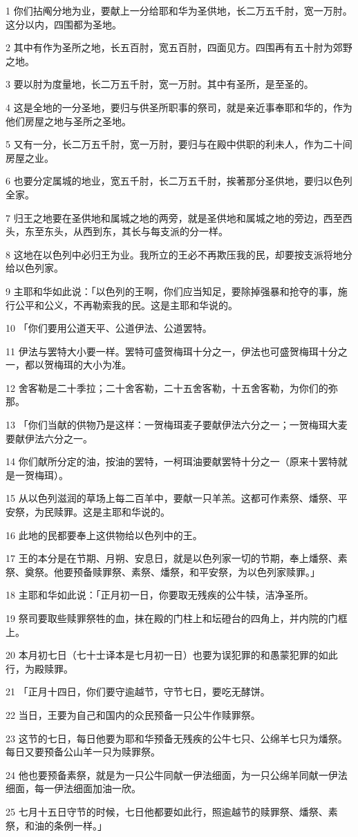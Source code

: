 \par 1 你们拈阄分地为业，要献上一分给耶和华为圣供地，长二万五千肘，宽一万肘。这分以内，四围都为圣地。
\par 2 其中有作为圣所之地，长五百肘，宽五百肘，四面见方。四围再有五十肘为郊野之地。
\par 3 要以肘为度量地，长二万五千肘，宽一万肘。其中有圣所，是至圣的。
\par 4 这是全地的一分圣地，要归与供圣所职事的祭司，就是亲近事奉耶和华的，作为他们房屋之地与圣所之圣地。
\par 5 又有一分，长二万五千肘，宽一万肘，要归与在殿中供职的利未人，作为二十间房屋之业。
\par 6 也要分定属城的地业，宽五千肘，长二万五千肘，挨著那分圣供地，要归以色列全家。
\par 7 归王之地要在圣供地和属城之地的两旁，就是圣供地和属城之地的旁边，西至西头，东至东头，从西到东，其长与每支派的分一样。
\par 8 这地在以色列中必归王为业。我所立的王必不再欺压我的民，却要按支派将地分给以色列家。
\par 9 主耶和华如此说：「以色列的王啊，你们应当知足，要除掉强暴和抢夺的事，施行公平和公义，不再勒索我的民。这是主耶和华说的。
\par 10 「你们要用公道天平、公道伊法、公道罢特。
\par 11 伊法与罢特大小要一样。罢特可盛贺梅珥十分之一，伊法也可盛贺梅珥十分之一，都以贺梅珥的大小为准。
\par 12 舍客勒是二十季拉；二十舍客勒，二十五舍客勒，十五舍客勒，为你们的弥那。
\par 13 「你们当献的供物乃是这样：一贺梅珥麦子要献伊法六分之一；一贺梅珥大麦要献伊法六分之一。
\par 14 你们献所分定的油，按油的罢特，一柯珥油要献罢特十分之一（原来十罢特就是一贺梅珥）。
\par 15 从以色列滋润的草场上每二百羊中，要献一只羊羔。这都可作素祭、燔祭、平安祭，为民赎罪。这是主耶和华说的。
\par 16 此地的民都要奉上这供物给以色列中的王。
\par 17 王的本分是在节期、月朔、安息日，就是以色列家一切的节期，奉上燔祭、素祭、奠祭。他要预备赎罪祭、素祭、燔祭，和平安祭，为以色列家赎罪。」
\par 18 主耶和华如此说：「正月初一日，你要取无残疾的公牛犊，洁净圣所。
\par 19 祭司要取些赎罪祭牲的血，抹在殿的门柱上和坛磴台的四角上，并内院的门框上。
\par 20 本月初七日（七十士译本是七月初一日）也要为误犯罪的和愚蒙犯罪的如此行，为殿赎罪。
\par 21 「正月十四日，你们要守逾越节，守节七日，要吃无酵饼。
\par 22 当日，王要为自己和国内的众民预备一只公牛作赎罪祭。
\par 23 这节的七日，每日他要为耶和华预备无残疾的公牛七只、公绵羊七只为燔祭。每日又要预备公山羊一只为赎罪祭。
\par 24 他也要预备素祭，就是为一只公牛同献一伊法细面，为一只公绵羊同献一伊法细面，每一伊法细面加油一欣。
\par 25 七月十五日守节的时候，七日他都要如此行，照逾越节的赎罪祭、燔祭、素祭，和油的条例一样。」

